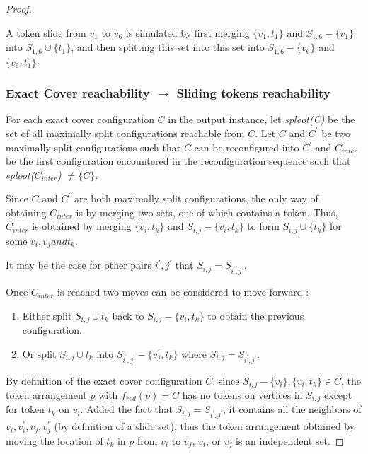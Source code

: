 \begin{proof}
\begin{example}A token slide from $v_1$ to $v_6$ is simulated by first merging $\{v_1, t_1\}$ and $S_{1,6} - \{v_1\}$ into $S_{1,6} \cup \{t_1\}$,
and then splitting this set into this set into $S_{1,6} - \{v_6\}$ and $\{v_6, t_1\}$.
\end{example}

\subsubsection{Exact Cover reachability $\rightarrow$ Sliding tokens reachability} 

For each exact cover configuration $C$ in the output instance, let \textit{sploot(C)} be the set of all maximally split configurations reachable
from $C$. Let $C$ and $C^{'}$ be two maximally split configurations such that $C$ can be reconfigured into $C^{'}$ and $C_{inter}$ be the first
configuration encountered in the reconfiguration sequence such that \textit{sploot($C_{inter}$)} $\neq \{C\}$.

\begin{obs}
Since $C$ and $C^{'}$ are both maximally split configurations, the only way of obtaining $C_{inter}$ is by merging two sets, one of which contains
a token. Thus, $C_{inter}$ is obtained by merging $\{v_i, t_k\}$ and $S_{i,j} - \{v_i, t_k\}$  to form $S_{i,j} \cup \{t_k\}$ for
some $v_i, v_j and t_k$.
\end{obs}

\begin{remark}
It may be the case for other pairs $i^{'}, j^{'}$ that $S_{i,j} = S_{i^{'}, j^{'}}$.
\end{remark}

Once $C_{inter}$ is reached two moves can be considered to move forward :
\begin{enumerate}
  \item Either split $S_{i,j} \cup t_k$ back to $S_{i,j} - \{v_i,t_k\}$ to obtain the previous configuration.
  \item Or split $S_{i,j} \cup t_k$ into $S_{i^{'},j^{'}} - \{v_j^{'},t_k\}$ where $S_{i,j} = S_{i^{'}, j^{'}}$.
\end{enumerate}

By definition of the exact cover configuration $C$, since $S_{i,j} - \{v_i\}, \{v_i, t_k\} \in C$, the token
arrangement $p$ with $f_{red}(p) = C$ has no tokens on vertices in $S_{i,j}$ except for token $t_k$ on $v_i$. Added the fact
that $S_{i,j} = S_{i^{'}, j^{'}}$, it contains all the neighbors of $v_i, v_i^{'}, v_j, v_j^{'}$ (by definition of a slide set), thus the token
arrangement obtained by moving the location of $t_k$ in $p$ from $v_i$ to $v_j$, $v_i$, or $v_j$ is an independent set.


\end{proof}
